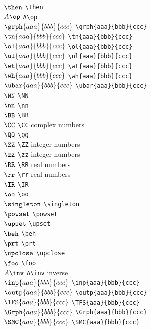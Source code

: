 \documentclass[11pt, book]{memoir}
\begin{document}
\begin{multicols}{2}
$\then$ \verb|\then| \\
$A\op$ \verb|A\op| \\
$\grph{aaa}{bbb}{ccc}$ \verb|\grph{aaa}{bbb}{ccc}| \\
$\tn{aaa}{bbb}{ccc}$ \verb|\tn{aaa}{bbb}{ccc}| \\
$\ol{aaa}{bbb}{ccc}$ \verb|\ol{aaa}{bbb}{ccc}| \\
$\ul{aaa}{bbb}{ccc}$ \verb|\ul{aaa}{bbb}{ccc}| \\
$\wt{aaa}{bbb}{ccc}$ \verb|\wt{aaa}{bbb}{ccc}| \\
$\wh{aaa}{bbb}{ccc}$ \verb|\wh{aaa}{bbb}{ccc}| \\
$\ubar{aaa}{bbb}{ccc}$ \verb|\ubar{aaa}{bbb}{ccc}| \\
$\NN$ \verb|\NN| \\
$\nn$ \verb|\nn| \\
$\BB$ \verb|\BB| \\
$\CC$ \verb|\CC| complex numbers \\
$\QQ$ \verb|\QQ| \\
$\ZZ$ \verb|\ZZ| integer numbers \\
$\zz$ \verb|\zz| integer numbers \\
$\RR$ \verb|\RR| real numbers \\
$\rr$ \verb|\rr| real numbers \\
$\IR$ \verb|\IR| \\
$\oo$ \verb|\oo| \\
$\singleton$ \verb|\singleton| \\
$\powset$ \verb|\powset| \\
$\upset$ \verb|\upset| \\
$\beh$ \verb|\beh| \\
$\prt$ \verb|\prt| \\
$\upclose$ \verb|\upclose| \\
$\foo$ \verb|\foo| \\
$A\inv$ \verb|A\inv| inverse \\
$\inp{aaa}{bbb}{ccc}$ \verb|\inp{aaa}{bbb}{ccc}| \\
$\outp{aaa}{bbb}{ccc}$ \verb|\outp{aaa}{bbb}{ccc}| \\
$\TFS{aaa}{bbb}{ccc}$ \verb|\TFS{aaa}{bbb}{ccc}| \\
$\Grph{aaa}{bbb}{ccc}$ \verb|\Grph{aaa}{bbb}{ccc}| \\
$\SMC{aaa}{bbb}{ccc}$ \verb|\SMC{aaa}{bbb}{ccc}| \\

\end{multicols}
\end{document}
